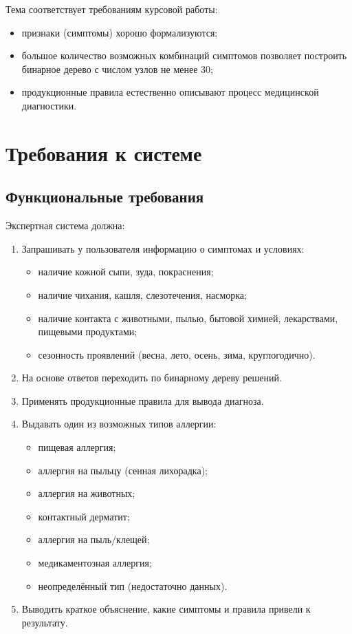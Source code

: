 \documentclass[a4paper,14pt]{extarticle}
\begin{document}
	Тема соответствует требованиям курсовой работы:
	\begin{itemize}
		\item признаки (симптомы) хорошо формализуются;
		\item большое количество возможных комбинаций симптомов позволяет построить бинарное дерево с числом узлов не менее 30;
		\item продукционные правила естественно описывают процесс медицинской диагностики.
	\end{itemize}
	
	\newpage
	
	\section{Требования к системе}
	
	\subsection{Функциональные требования}
	
	Экспертная система должна:
	\begin{enumerate}
		\item Запрашивать у пользователя информацию о симптомах и условиях:
		\begin{itemize}
			\item наличие кожной сыпи, зуда, покраснения;
			\item наличие чихания, кашля, слезотечения, насморка;
			\item наличие контакта с животными, пылью, бытовой химией, лекарствами, пищевыми продуктами;
			\item сезонность проявлений (весна, лето, осень, зима, круглогодично).
		\end{itemize}
		\item На основе ответов переходить по бинарному дереву решений.
		\item Применять продукционные правила для вывода диагноза.
		\item Выдавать один из возможных типов аллергии:
		\begin{itemize}
			\item пищевая аллергия;
			\item аллергия на пыльцу (сенная лихорадка);
			\item аллергия на животных;
			\item контактный дерматит;
			\item аллергия на пыль/клещей;
			\item медикаментозная аллергия;
			\item неопределённый тип (недостаточно данных).
		\end{itemize}
		\item Выводить краткое объяснение, какие симптомы и правила привели к результату.
	\end{enumerate}
	
\end{document}
